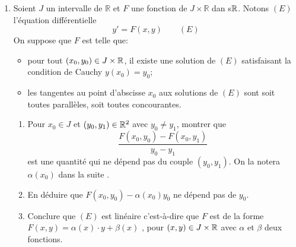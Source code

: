 \begin{enumerate}
\item Soient $J$ un intervalle de $\mathbb{R}$ et $F$ une fonction de $J\times\mathbb{R}$ dan s$\mathbb{R}$. Notons $(E)$ l'équation différentielle
\begin{displaymath}
y'=F(x,y)\qquad (E) 
\end{displaymath}
On suppose que $F$ est telle que:
  \begin{itemize}
\item pour tout $(x_0,y_0)\in J\times \mathbb{R}$, il existe une solution de $(E)$ satisfaisant la condition de Cauchy $y(x_0)=y_0$;
\item les tangentes au point d'abscisse $x_0$ aux solutions de $(E)$ sont soit toutes parallèles, soit toutes concourantes.
  \end{itemize}
  \begin{enumerate}
    \item Pour $x_0\in J$ et $(y_0,y_1)\in\mathbb{R}^2$ avec $y_0\neq y_1$, montrer que 
\begin{displaymath}
\frac{F(x_0,y_0)-F(x_0,y_1)}{y_0-y_1} 
\end{displaymath}
est une quantité qui ne dépend pas du couple $(y_0,y_1)$. On la notera $\alpha(x_0)$ dans la suite .
    \item En déduire que $F(x_0,y_0)-\alpha(x_0)y_0$ ne dépend pas de $y_0$.
    \item Conclure que $(E)$ est linéaire c'est-à-dire que $F$ est de la forme $F(x,y)=\alpha(x)\cdot y+\beta(x)$ , pour $(x,y)\in J\times \mathbb{R}$ avec $\alpha$ et $\beta$ deux fonctions.
  \end{enumerate}

\end{enumerate}
